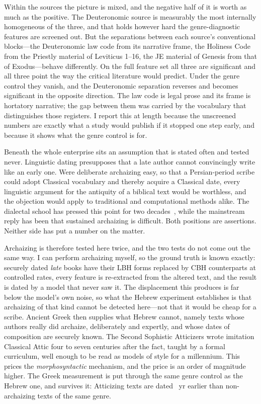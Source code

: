 \documentclass[10pt,letterpaper]{article}
\newcommand{\cbh}{CBH}
\newcommand{\lbh}{LBH}
\begin{document}
Within the sources the picture is mixed, and the negative half of it is worth as
much as the positive.  The Deuteronomic source is measurably the most internally
homogeneous of the three, and that holds however hard the genre-diagnostic
features are screened out.  But the separations between each source's
conventional blocks---the Deuteronomic law code from its narrative frame, the
Holiness Code from the Priestly material of Leviticus 1--16, the JE material of
Genesis from that of Exodus---behave differently.  On the full feature set all
three are significant and all three point the way the critical literature would
predict.  Under the genre control they vanish, and the Deuteronomic separation
reverses and becomes significant in the opposite direction.  The law code is
legal prose and its frame is hortatory narrative; the gap between them was
carried by the vocabulary that distinguishes those registers.  I report this at
length because the unscreened numbers are exactly what a study would publish if
it stopped one step early, and because it shows what the genre control is for.

Beneath the whole enterprise sits an assumption that is stated often and tested
never.  Linguistic dating presupposes that a late author cannot convincingly
write like an early one.  Were deliberate archaizing easy, so that a
Persian-period scribe could adopt Classical vocabulary and thereby acquire a
Classical date, every linguistic argument for the antiquity of a biblical text
would be worthless, and the objection would apply to traditional and
computational methods alike.  The dialectal school has pressed this point for
two decades~\cite{Young2008,Rezetko2014}, while the mainstream reply has been
that sustained archaizing is difficult.  Both positions are assertions.
Neither side has put a number on the matter.

Archaizing is therefore tested here twice, and the two tests do not come out
the same way.  I can perform archaizing myself, so the ground truth is known
exactly: securely dated \emph{late} books have their \lbh{} forms replaced by
\cbh{} counterparts at controlled rates, every feature is re-extracted from the
altered text, and the result is dated by a model that never saw it.  The
displacement this produces is far below the model's own noise, so what the
Hebrew experiment establishes is that archaizing of that kind cannot be detected
here---not that it would be cheap for a scribe.
Ancient Greek then supplies what Hebrew cannot, namely texts whose authors
really did archaize, deliberately and expertly, and whose dates of composition
are securely known.  The Second Sophistic Atticizers wrote imitation Classical
Attic four to seven centuries after the fact, taught by a formal curriculum,
well enough to be read as models of style for a millennium.  This prices the
\emph{morphosyntactic} mechanism, and the price is an order of magnitude
higher.  The Greek measurement is put through the same genre control as the
Hebrew one, and survives it: Atticizing texts are dated \GKwithinAbs~yr
earlier than non-archaizing texts of the same genre.
\end{document}

